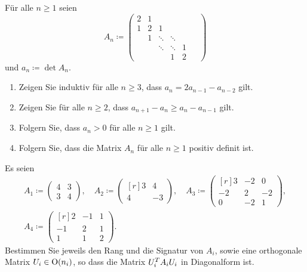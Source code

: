 \documentclass[a4paper, 10pt]{scrartcl}
\begin{document}
\begin{question}
  Für alle $n \geq 1$ seien
  \[
              A_n
    \coloneqq \begin{pmatrix}
                2 & 1 &         &         &   \phantom{\ddots}  \\
                1 & 2 & 1       &         &   \phantom{\ddots}  \\
                  & 1 & \ddots  & \ddots  &   \phantom{\ddots}  \\
                  &   & \ddots  & \ddots  & 1 \phantom{\ddots}  \\
                  &   &         &      1  & 2 \phantom{\ddots}
              \end{pmatrix}
  \]
  und $a_n \coloneqq \det A_n$.
  \begin{enumerate}
    \item
      Zeigen Sie induktiv für alle $n \geq 3$, dass $a_n = 2 a_{n-1} - a_{n-2}$ gilt.
    \item
      Zeigen Sie für alle $n \geq 2$, dass $a_{n+1} - a_n \geq a_n - a_{n-1}$ gilt.
    \item
      Folgern Sie, dass $a_n > 0$ für alle $n \geq 1$ gilt.
    \item
      Folgern Sie, dass die Matrix $A_n$ für alle $n \geq 1$ positiv definit ist.
  \end{enumerate}
\end{question}





\begin{question}
  Es seien
  \begin{gather*}
              A_1
    \coloneqq \begin{pmatrix}
                4 & 3 \\
                3 & 4
              \end{pmatrix},
    \quad    
              A_2
    \coloneqq \begin{pmatrix*}[r]
                3 &   4 \\
                4 &  -3
              \end{pmatrix*},
    \quad     A_3
    \coloneqq \begin{pmatrix*}[r]
                 3  & -2  &  0  \\
                -2  &  2  & -2  \\
                 0  & -2  &  1
              \end{pmatrix*},
    \\
              A_4
    \coloneqq \begin{pmatrix*}[r]
                 2  & -1  & 1 \\
                -1  &  2  & 1 \\
                 1  &  1  & 2
              \end{pmatrix*}.
  \end{gather*}
  Bestimmen Sie jeweils den Rang und die Signatur von $A_i$, sowie eine orthogonale Matrix $U_i \in \operatorname{O}(n_i)$, so dass die Matrix $U_i^T A_i U_i$ in Diagonalform ist.
\end{question}
\end{document}

